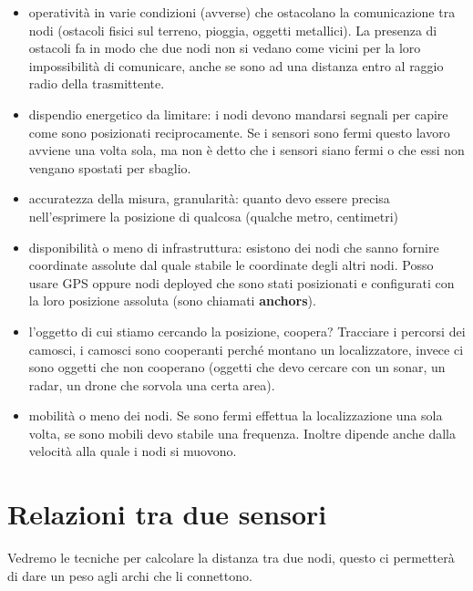 \documentclass[12pt,italian]{report}
\begin{document}
\begin{itemize}
    \item operatività in varie condizioni (avverse) che ostacolano la comunicazione tra nodi (ostacoli fisici sul terreno, pioggia, oggetti metallici). La presenza di ostacoli fa in modo che due nodi non si vedano come vicini per la loro impossibilità di comunicare, anche se sono ad una distanza entro al raggio radio della trasmittente. 
    \item dispendio energetico da limitare: i nodi devono mandarsi segnali per capire come sono posizionati reciprocamente. Se i sensori sono fermi questo lavoro avviene una volta sola, ma non è detto che i sensori siano fermi o che essi non vengano spostati per sbaglio. 
    \item accuratezza della misura, granularità: quanto devo essere precisa nell'esprimere la posizione di qualcosa (qualche metro, centimetri)
    \item disponibilità o meno di infrastruttura: esistono dei nodi che sanno fornire coordinate assolute dal quale stabile le coordinate degli altri nodi. Posso usare GPS oppure nodi deployed che sono stati posizionati e configurati con la loro posizione assoluta (sono chiamati \textbf{anchors}).
    \item l'oggetto di cui stiamo cercando la posizione, coopera? Tracciare i percorsi dei camosci, i camosci sono cooperanti perché montano un localizzatore, invece ci sono oggetti che non cooperano (oggetti che devo cercare con un sonar, un radar, un drone che sorvola una certa area). 
    \item mobilità o meno dei nodi. Se sono fermi effettua la localizzazione una sola volta, se sono mobili devo stabile una frequenza. Inoltre dipende anche dalla velocità alla quale i nodi si muovono. 
\end{itemize}

\section{Relazioni tra due sensori}
Vedremo le tecniche per calcolare la distanza tra due nodi, questo ci permetterà di dare un peso agli archi che li connettono.
\end{document}
